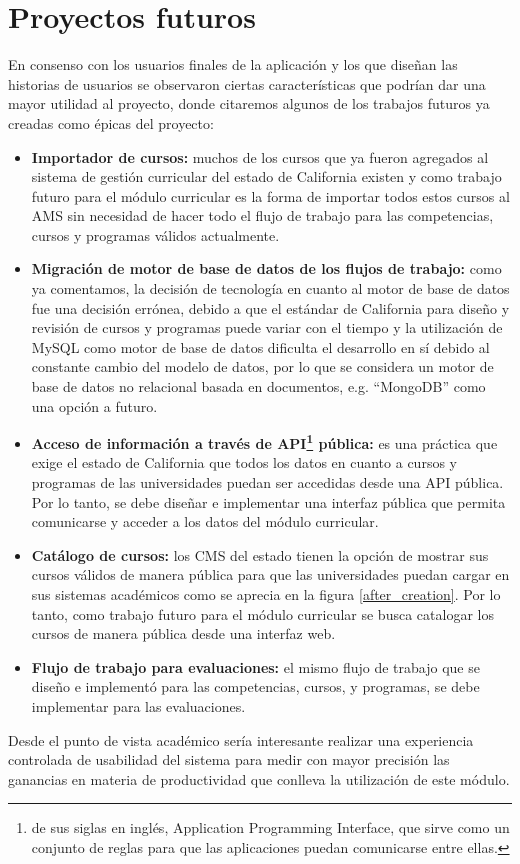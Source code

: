 \section{Proyectos futuros}
En consenso con los usuarios finales de la aplicación y los que diseñan las historias de usuarios se observaron ciertas características que podrían dar una mayor utilidad al proyecto, donde citaremos algunos de los trabajos futuros ya creadas como épicas del proyecto:
\begin{itemize}
	\item \textbf{Importador de cursos:} muchos de los cursos que ya fueron agregados al sistema de gestión curricular del estado de California existen y como trabajo futuro para el módulo curricular es la forma de importar todos estos cursos al AMS sin necesidad de hacer todo el flujo de trabajo para las competencias, cursos y programas válidos actualmente.
	\item \textbf{Migración de motor de base de datos de los flujos de trabajo:} como ya comentamos, la decisión de tecnología en cuanto al motor de base de datos fue una decisión errónea, debido a que el estándar de California para diseño y revisión de cursos y programas puede variar con el tiempo y la utilización de MySQL como motor de base de datos dificulta el desarrollo en sí debido al constante cambio del modelo de datos, por lo que se considera un motor de base de datos no relacional basada en documentos, e.g. \enquote{MongoDB} como una opción a futuro.
	\item \textbf{Acceso de información a través de API\footnote{de sus siglas en inglés, Application Programming Interface, que sirve como un conjunto de reglas para que las aplicaciones puedan comunicarse entre ellas.} pública:} es una práctica que exige el estado de California que todos los datos en cuanto a cursos y programas de las universidades puedan ser accedidas desde una API pública. Por lo tanto, se debe diseñar e implementar una interfaz pública que permita comunicarse y acceder a los datos del módulo curricular.
	\item \textbf{Catálogo de cursos:} los CMS del estado tienen la opción de mostrar sus cursos válidos de manera pública para que las universidades puedan cargar en sus sistemas académicos como se aprecia en la figura \ref{after_creation}. Por lo tanto, como trabajo futuro para el módulo curricular se busca catalogar los cursos de manera pública desde una interfaz web.
	\item \textbf{Flujo de trabajo para evaluaciones:} el mismo flujo de trabajo que se diseño e implementó para las competencias, cursos, y programas, se debe implementar para las evaluaciones.
\end{itemize}
Desde el punto de vista académico sería interesante realizar una experiencia controlada de usabilidad del sistema para medir con mayor precisión las ganancias en materia de productividad que conlleva la utilización de este módulo.